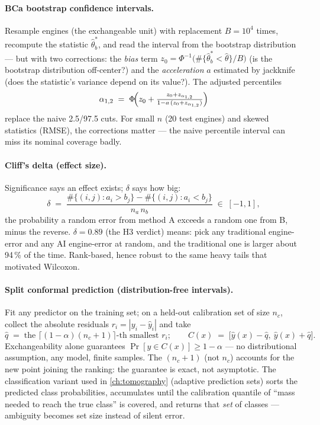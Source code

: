\paragraph{BCa bootstrap confidence intervals.} Resample engines (the exchangeable unit)
with replacement $B = 10^4$ times, recompute the statistic $\hat\theta^{*}_b$, and read the
interval from the bootstrap distribution --- but with two corrections: the \emph{bias}
term $z_0 = \Phi^{-1}\bigl(\#\{\hat\theta^{*}_b < \hat\theta\}/B\bigr)$ (is the bootstrap
distribution off-center?) and the \emph{acceleration} $a$ estimated by jackknife (does the
statistic's variance depend on its value?). The adjusted percentiles
\begin{equation}
  \alpha_{1,2} \;=\; \Phi\!\Bigl(z_0 + \tfrac{z_0 + z_{\alpha_{1,2}}}{1 - a\,(z_0 + z_{\alpha_{1,2}})}\Bigr)
  \label{eq:bca}
\end{equation}
replace the naive 2.5/97.5 cuts. For small $n$ (20 test engines) and skewed statistics
(RMSE), the corrections matter --- the naive percentile interval can miss its nominal
coverage badly.

\paragraph{Cliff's delta (effect size).} Significance says an effect exists; $\delta$ says
how big:
\begin{equation}
  \delta \;=\; \frac{\#\{(i,j): a_i > b_j\} - \#\{(i,j): a_i < b_j\}}{n_a\, n_b}
  \;\in\; [-1, 1],
  \label{eq:cliff}
\end{equation}
the probability a random error from method A exceeds a random one from B, minus the
reverse. $\delta = 0.89$ (the H3 verdict) means: pick any traditional engine-error and any
AI engine-error at random, and the traditional one is larger about 94\,\% of the time.
Rank-based, hence robust to the same heavy tails that motivated Wilcoxon.

\paragraph{Split conformal prediction (distribution-free intervals).} Fit any predictor on
the training set; on a held-out calibration set of size $n_c$, collect the absolute
residuals $r_i = |y_i - \hat{y}_i|$ and take
\begin{equation}
  \hat{q} \;=\; \text{the } \lceil (1-\alpha)(n_c + 1)\rceil\text{-th smallest } r_i;
  \qquad
  C(x) \;=\; \bigl[\hat{y}(x) - \hat{q},\ \hat{y}(x) + \hat{q}\bigr].
  \label{eq:conformal}
\end{equation}
Exchangeability alone guarantees $\Pr[y \in C(x)] \ge 1 - \alpha$ --- no distributional
assumption, any model, finite samples. The $(n_c + 1)$ (not $n_c$) accounts for the new
point joining the ranking: the guarantee is exact, not asymptotic. The classification
variant used in \cref{ch:tomography} (adaptive prediction sets) sorts the predicted class
probabilities, accumulates until the calibration quantile of ``mass needed to reach the
true class'' is covered, and returns that \emph{set} of classes --- ambiguity becomes set
size instead of silent error.

